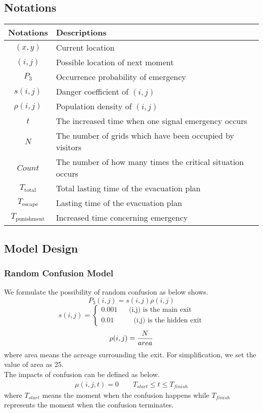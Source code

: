 \documentclass{mcmthesis}
\begin{document}
\subsection{Notations}
\begin{table}[htbp]
	\begin{tabular}{@{}cl@{}}
		\toprule
		Notations                & Descriptions                                         \\ \midrule
		\((x,y)\)                & Current location                                \\
		\((i,j)\)                & Possible location of  next moment                        \\
		\(P_3\)                  & Occurrence probability of emergency                 \\
		\(s(i,j)\)               & Danger coefficient of \((i,j)\)                      \\
		\(\rho(i,j)\)            & Population density of \((i,j)\)                      \\
		\(t\) &The increased time when one signal emergency occurs\\
		\(N\)                        & The number of grids which have been occupied by visitors \\
		\(Count\)  &The number of how many times the critical situation occurs\\
		\(T_\textrm{total}\)     & Total lasting time of the evacuation plan                                           \\
		\(T_\textrm{escape}\)    & Lasting time of the evacuation plan                                       \\
		\(T_\textrm{punishment}\)   & Increased time concerning emergency                                 \\ \bottomrule
	\end{tabular}
\end{table}
\subsection{Model Design}
\subsubsection{Random Confusion Model}
\noindent We formulate the possibility of random confusion as below shows.
\[
	P_3(i,j)=s(i,j)\rho(i,j)
\]
\[
	s(i,j)=\left\{\begin{matrix}
			0.001& \textrm{ (i,j) is the main exit}\\
			0.01 \quad& \quad\textrm{(i,j) is the hidden exit}
	\end{matrix}\right.
\]
\[
	\rho(i,j)=\frac{N}{area}  \\
\]
\indent  where area means the acreage surrounding the exit. For simplification, we set the value of area as 25.\\
\indent The impacts of confusion can be defined as below.
\[
	\begin{matrix}
		\mu(i,j,t)=0  \qquad T_{start}\le t \le T_{finish}
	\end{matrix}
\]
\indent where \(T_{start}\) means the moment when the confusion happens while \(T_{finish}\) represents the moment when the confusion terminates.
\end{document}
